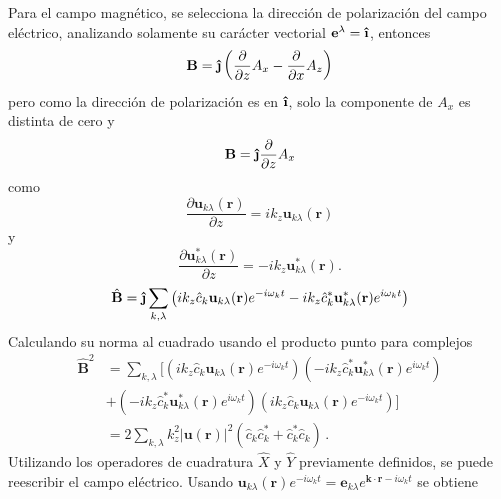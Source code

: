 Para el campo magnético, se selecciona la dirección de polarización del campo eléctrico, analizando solamente su carácter vectorial
$\mathbf{e}^{\lambda}= \mathbf{\hat{\textnormal{\bfseries\i}}}$, entonces
\begin{equation*}
  \mathbf{B} = \mathbf{\hat{\textnormal{\bfseries\j}}} \left( \frac{\partial}{\partial z} A_x - \frac{\partial}{\partial x} A_z \right)
\end{equation*}
pero como la dirección de polarización es en $\mathbf{\hat{\textnormal{\bfseries\i}}}$, solo la componente de $A_x$ es distinta de cero y
\begin{equation*}
  \mathbf{B} = \mathbf{\hat{\textnormal{\bfseries\j}}} \frac{\partial}{\partial z} A_x
\end{equation*}
como
\begin{equation*}
  \frac{\partial \mathbf{u}_{k\lambda}(\mathbf{r})}{\partial z} = i k_z \mathbf{u}_{k\lambda}(\mathbf{r})
\end{equation*}
y
\begin{equation*}
  \frac{\partial \mathbf{u}^{*}_{k\lambda}(\mathbf{r})}{\partial z} = -i k_z \mathbf{u}^{*}_{k\lambda}(\mathbf{r}).
\end{equation*}
\begin{equation*}
  \hat{\mathbf{B}} = \mathbf{\hat{\textnormal{\bfseries\j}}} \sum_{k,\lambda} \left( i k_z \hat{c}_{k} \mathbf{u}_{k\lambda}(\mathbf{r})e^{-i\omega_{k} t} - i k_z \hat{c}_{k}^* \mathbf{u}_{k\lambda}^*(\mathbf{r})e^{i\omega_{k} t}  \right)
\end{equation*}
Calculando su norma al cuadrado usando el producto punto para complejos
\begin{align*}
  \hat{\mathbf{B}}^2 & = \sum_{k,\lambda} \Big[ \left(ik_z \hat{c}_{k} \mathbf{u}_{k\lambda}(\mathbf{r})e^{-i\omega_{k} t}\right)\left(-ik_z \hat{c}_{k}^{*} \mathbf{u}_{k\lambda}^*(\mathbf{r})e^{i\omega_{k} t} \right) \\
                     & + \left(-ik_z \hat{c}_{k}^{*} \mathbf{u}_{k\lambda}^*(\mathbf{r})e^{i\omega_{k} t} \right)  \left(ik_z \hat{c}_{k} \mathbf{u}_{k\lambda}(\mathbf{r})e^{-i\omega_{k} t}\right) \Big]                \\
                     & = 2 \sum_{k,\lambda} k_z^2 |\mathbf{u}(\mathbf{r})|^2 \left( \hat{c}_{k} \hat{c}_{k}^* + \hat{c}_{k}^* \hat{c}_{k} \right) \,.
\end{align*}
Utilizando los operadores de cuadratura $\hat{X}$ y $\hat{Y}$ previamente definidos, se puede reescribir el campo eléctrico. Usando $\mathbf{u}_{k\lambda}(\mathbf{r})e^{-i\omega_k t} = \mathbf{e}_{k\lambda} e^{\mathbf{k}\cdot\mathbf{r}-i\omega_k t}$ se obtiene
